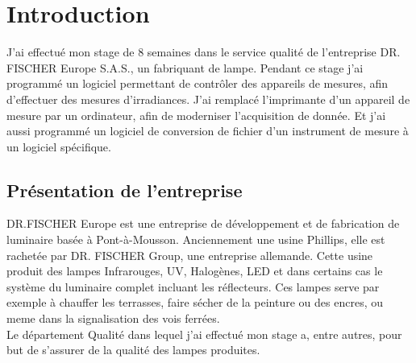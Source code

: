 \documentclass[12pt]{article}
\begin{document}
\thispagestyle{empty}

\newpage

\restoregeometry
\thispagestyle{empty}
\tableofcontents
\newpage
\onehalfspacing

\section{Introduction}

J'ai effectué mon stage de 8 semaines dans le service qualité de l'entreprise DR. FISCHER Europe S.A.S., un fabriquant de lampe.
Pendant ce stage j'ai programmé un logiciel permettant de contrôler des appareils de mesures, afin d'effectuer des mesures d'irradiances.
J'ai remplacé l'imprimante d'un appareil de mesure par un ordinateur, afin de moderniser l'acquisition de donnée.
Et j'ai aussi programmé un logiciel de conversion de fichier d'un instrument de mesure à un logiciel spécifique.


\newpage
\subsection{Présentation de l'entreprise}

DR.FISCHER Europe est une entreprise de développement et de fabrication de luminaire basée à Pont-à-Mousson.
Anciennement une usine Phillips, elle est rachetée par DR. FISCHER Group, une entreprise allemande.
Cette usine produit des lampes Infrarouges, UV, Halogènes, LED et dans certains cas le système du luminaire complet incluant les réflecteurs.
Ces lampes serve par exemple à chauffer les terrasses, faire sécher de la peinture ou des encres, ou meme dans la signalisation des vois ferrées.\\
Le département Qualité dans lequel j'ai effectué mon stage a, entre autres, pour but de s'assurer de la qualité des lampes produites.
\newpage
\end{document}
